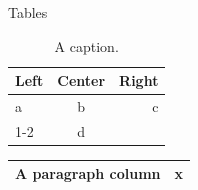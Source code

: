 \documentclass{nicrainha}
\begin{document}
\begin{slide}{Tables}
  \begin{table}
    \begin{tabular}{lcr}
      \toprule
      Left & Center & Right \\
      \midrule
      a & b & c \\
      \cmidrule(lr){1-2}
      \multicolumn{2}{c}{both} & d \\
      \bottomrule
    \end{tabular}
    \caption{A caption.}
  \end{table}
  \begin{tabular}{|p{3cm}|l|}
    \hline
    A paragraph column & x \\
    \hline
  \end{tabular}
\end{slide}
\end{document}
